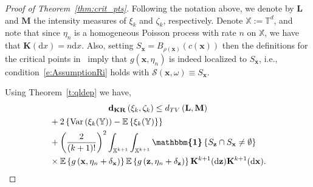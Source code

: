\documentclass[10pt]{amsart}
\theoremstyle{definition}\newtheorem{defi}[theo]{Definition}\newtheorem{rema}[theo]{Remark}\newtheorem{exam}[theo]{Example}\newtheorem{exem}[theo]{Example}\newtheorem{nota}[theo]{Notation}
\newcommand*\bL{\mathbf{L}}
\newcommand*\bM{\mathbf{M}}
\newcommand*\bK{\mathbf{K}}
\newcommand{\bz}{\mathbf{z}}
\newcommand{\bx}{\mathbf{x}}
\newcommand*\dkr{\mathbf{d_{KR}}}
\newcommand*\T{\mathbb{T}}
\newcommand*\X{\mathbb{X}}
\newcommand*\Y{\mathbb{Y}}
\newcommand{\E}{\mathbb{E}}
\newcommand*\cS{\mathcal{S}}
\newcommand*\md{\mathrm{d}}
\newcommand{\mean}[1] {\E\left\{{#1}\right\}}
\newcommand{\ind}{\boldsymbol{\mathbbm{1}}}
\newcommand{\var}[1]{\mathrm{Var}\param{{#1}}}
\newcommand{\set}[1]{\left\{#1\right\}}
\newcommand{\param}[1]{\left(#1\right)}
\begin{document}
\begin{proof}[Proof of Theorem~\ref{thm:crit_pts}]
Following the notation above, we denote by $\bL$ and $\bM$ the intensity measures of $\xi_k$ and $\zeta_k$, respectively. Denote $\X := \T^d$, and note that since $\eta_n$ is a homogeneous Poisson process with rate $n$ on $\X$, we have that $\bK(\md x) = n\md x$. Also, setting $S_{\bx} = B_{\rho(\bx)}(c(\bx))$ then the definitions for the critical points in~\cite{Bobrowski2019} imply that $g(\bx,\eta_n)$ is indeed localized to $S_{\bx}$, i.e., condition~\eqref{e:AssumptionRi} holds with $\cS(\bx,\omega) \equiv S_{\bx}$.

Using Theorem~\ref{t:qldep} we have,
\begin{multline}\label{e:crit_pt_KR}
\dkr\left(\xi_k,\zeta_k\right) \le d_{TV}\left({\bL},{\bM}\right)\\
\begin{aligned} 
&+ 2\left\{\var{\xi_k(\Y)} - \mean{\xi_k(\Y)}\right\}\\
&+ \param{\frac{2}{(k+1)!}}^2 \int_{\X^{k+1}} \int_{\X^{k+1}}\ind\set{S_{\bz}\cap S_{\bx}\ne \emptyset}\\
& \times\mean{g\left(\bx,{\eta_n}+\delta_{\bx}\right)} \mean{g\left(\bz,{\eta_n}+\delta_{\bz}\right)} \bK^{k+1}(\md\bz) \bK^{k+1}(\md\bx).
\end{aligned}
\end{multline}


\end{proof}
\end{document}
